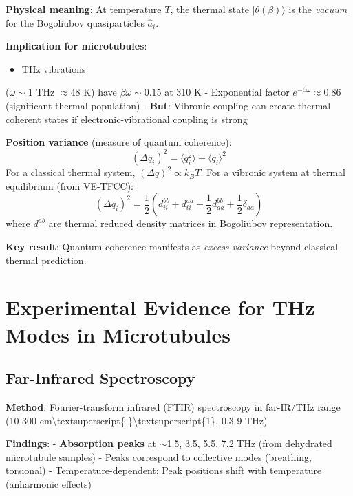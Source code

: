 \textbf{Physical meaning}: At temperature \(T\), the thermal state
\(|\theta(\beta)\rangle\) is the \emph{vacuum} for the Bogoliubov
quasiparticles \(\hat{a}_i\).

\textbf{Implication for microtubules}:
\begin{itemize}
\item THz vibrations
\end{itemize}

(\(\omega \sim 1\) THz \(\approx 48\) K) have \(\beta \omega \sim 0.15\)
at 310 K - Exponential factor \(e^{-\beta \omega} \approx 0.86\)
(significant thermal population) - \textbf{But}: Vibronic coupling can
create thermal coherent states if electronic-vibrational coupling is
strong

\textbf{Position variance} (measure of quantum coherence):
\begin{equation}
\label{eq:position-variance}
(\Delta q_i)^2 = \langle q_i^2 \rangle - \langle q_i \rangle^2
\end{equation} For a
classical thermal system, \((\Delta q)^2 \propto k_B T\). For a vibronic
system at thermal equilibrium (from VE-TFCC):
\[(\Delta q_i)^2 = \frac{1}{2} \left( d_{ii}^{bb} + d_{ii}^{aa} + \frac{1}{2} d_{aa}^{bb} + \frac{1}{2} \delta_{aa} \right)\]
where \(d^{ab}\) are thermal reduced density matrices in Bogoliubov
representation.

\textbf{Key result}: Quantum coherence manifests as \emph{excess
variance} beyond classical thermal prediction.



\section{Experimental Evidence for THz Modes in Microtubules}\label{experimental-evidence-for-thz-modes-in-microtubules}

\subsection{Far-Infrared Spectroscopy}\label{far-infrared-spectroscopy-established}

\textbf{Method}: Fourier-transform infrared (FTIR) spectroscopy in
far-IR/THz range (10-300
cm\textbackslash textsuperscript\{-\}\textbackslash textsuperscript\{1\},
0.3-9 THz)

\textbf{Findings}: - \textbf{Absorption peaks} at $\sim$1.5,
3.5, 5.5, 7.2 THz (from dehydrated microtubule samples) - Peaks
correspond to collective modes (breathing, torsional) -
Temperature-dependent: Peak positions shift with temperature (anharmonic
effects)

